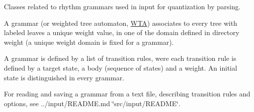 Classes related to rhythm {\ttfamily grammars} used in input for quantization by parsing.

A {\ttfamily grammar} (or weighted tree automaton, {\ttfamily \mbox{\hyperlink{classWTA}{W\+TA}}}) associates to every tree with {\ttfamily labeled} leaves a unique weight value, in one of the domain defined in directory {\ttfamily weight} (a unique {\ttfamily weight} domain is fixed for a {\ttfamily grammar}).

A {\ttfamily grammar} is defined by a list of {\ttfamily transition} rules, were each transition rule is defined by a target {\ttfamily state}, a body (sequence of states) and a {\ttfamily weight}. An initial {\ttfamily state} is distinguished in every {\ttfamily grammar}.

For reading and saving a {\ttfamily grammar} from a text file, describing transition rules and options, see ../input/\+R\+E\+A\+D\+ME.md \char`\"{}src/input/\+R\+E\+A\+D\+M\+E\char`\"{}. 